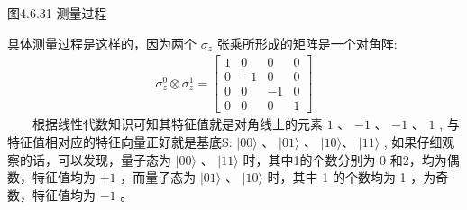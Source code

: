 \documentclass[a4paper,11pt,english]{sphinxmanual}
\begin{document}

\begin{center}图4.6.31 测量过程
\end{center}
\sphinxAtStartPar
具体测量过程是这样的，因为两个 \(\sigma_{z}\) 张乘所形成的矩阵是一个对角阵:
\begin{equation*}
\begin{split}\sigma_{z}^{0} \otimes \sigma_{z}^{1}=\left[\begin{array}{cccc} 1 & 0 & 0 & 0 \\ 0 & -1 & 0 & 0 \\ 0 & 0 & -1 & 0 \\ 0 & 0 & 0 & 1 \end{array}\right]\end{split}
\end{equation*}
\sphinxAtStartPar
  根据线性代数知识可知其特征值就是对角线上的元素  \(1\) 、 \(-1\)  、 \(-1\) 、 \(1\) , 与特征值相对应的特征向量正好就是基底S:  \(|00\rangle\) 、 \(|01\rangle\) 、 \(|10\rangle\)、 \(|11\rangle\) , 如果仔细观察的话，可以发现，量子态为  \(|00\rangle\) 、 \(|11\rangle\) 时，其中1的个数分别为 0 和2，均为偶数，特征值均为  \(+1\) ，而量子态为  \(|01\rangle\) 、 \(|10\rangle\) 时，其中 1 的个数均为 1 ，为奇数，特征值均为  \(-1\) 。
\end{document}
